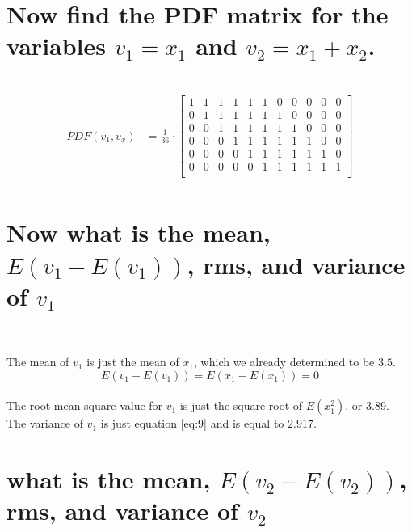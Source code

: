 \documentclass[12pt,letterpaper, onecolumn]{exam}
\begin{document}
\begin{questions}
\begin{parts}
        \part{Now find the PDF matrix for the variables $v_1 = x_1$ and $v_2 = x_1 + x_2$.}\\
		        \solution
		        \begin{equation}
		            \begin{split}
		                PDF(v_1,v_x) & = \frac{1}{36}\cdot
		                \begin{bmatrix}
		                    1 & 1 & 1 & 1 & 1 & 1 & 0 & 0 & 0 & 0 & 0 \\
		                    0 & 1 & 1 & 1 & 1 & 1 & 1 & 0 & 0 & 0 & 0 \\
		                    0 & 0 & 1 & 1 & 1 & 1 & 1 & 1 & 0 & 0 & 0 \\
		                    0 & 0 & 0 & 1 & 1 & 1 & 1 & 1 & 1 & 0 & 0 \\
		                    0 & 0 & 0 & 0 & 1 & 1 & 1 & 1 & 1 & 1 & 0 \\
		                    0 & 0 & 0 & 0 & 0 & 1 & 1 & 1 & 1 & 1 & 1 \\
		                \end{bmatrix}\\
		            \end{split}
		        \end{equation}
        \part{Now what is the mean, $E(v_1 - E(v_1))$, rms, and variance of $v_1$}\\
		        \solution

		        The mean of $v_1$ is just the mean of $x_1$, which we already determined to be $3.5$.\\

		        \begin{equation}
		            E(v_1 - E(v_1)) = E(x_1 - E(x_1)) = 0
		        \end{equation}\\

		        The root mean square value for $v_1$ is just the square root of $E(x_1^2)$, or $3.89$.\\

		        The variance of $v_1$ is just equation \ref{eq:9} and is equal to $2.917$.\\
        \part{what is the mean, $E(v_2 - E(v_2))$, rms, and variance of $v_2$}\\
		        \solution


\end{parts}
\end{questions}
\end{document}
